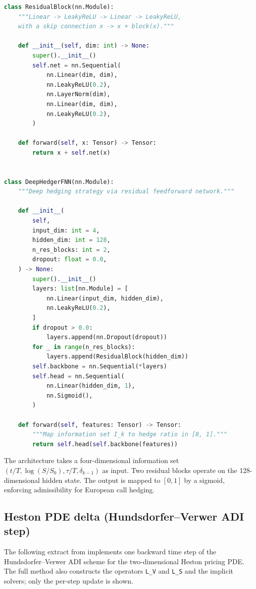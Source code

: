 \documentclass[12pt,a4paper]{article}
\theoremstyle{definition}
\theoremstyle{plain}
\theoremstyle{remark}
\theoremstyle{plain}
\begin{document}
\begin{lstlisting}[language=Python, caption={DeepHedgerFNN architecture}, label={lst:deep_hedger_code}]
class ResidualBlock(nn.Module):
    """Linear -> LeakyReLU -> Linear -> LeakyReLU,
    with a skip connection x -> x + block(x)."""

    def __init__(self, dim: int) -> None:
        super().__init__()
        self.net = nn.Sequential(
            nn.Linear(dim, dim),
            nn.LeakyReLU(0.2),
            nn.LayerNorm(dim),
            nn.Linear(dim, dim),
            nn.LeakyReLU(0.2),
        )

    def forward(self, x: Tensor) -> Tensor:
        return x + self.net(x)


class DeepHedgerFNN(nn.Module):
    """Deep hedging strategy via residual feedforward network."""

    def __init__(
        self,
        input_dim: int = 4,
        hidden_dim: int = 128,
        n_res_blocks: int = 2,
        dropout: float = 0.0,
    ) -> None:
        super().__init__()
        layers: list[nn.Module] = [
            nn.Linear(input_dim, hidden_dim),
            nn.LeakyReLU(0.2),
        ]
        if dropout > 0.0:
            layers.append(nn.Dropout(dropout))
        for _ in range(n_res_blocks):
            layers.append(ResidualBlock(hidden_dim))
        self.backbone = nn.Sequential(*layers)
        self.head = nn.Sequential(
            nn.Linear(hidden_dim, 1),
            nn.Sigmoid(),
        )

    def forward(self, features: Tensor) -> Tensor:
        """Map information set I_k to hedge ratio in [0, 1]."""
        return self.head(self.backbone(features))
\end{lstlisting}

The architecture takes a four-dimensional information set
$(t/T, \log(S/S_0), \tau/T, \delta_{k-1})$ as input. Two residual
blocks operate on the 128-dimensional hidden state. The output is
mapped to $[0,1]$ by a sigmoid, enforcing admissibility for European
call hedging.

\subsection{Heston PDE delta (Hundsdorfer--Verwer ADI step)}
\label{lst:heston_pde_step}

The following extract from 
implements one backward time step of the Hundsdorfer--Verwer ADI scheme
for the two-dimensional Heston pricing PDE. The full method also
constructs the operators \texttt{L\_V} and \texttt{L\_S} and the
implicit solvers; only the per-step update is shown.
\end{document}
